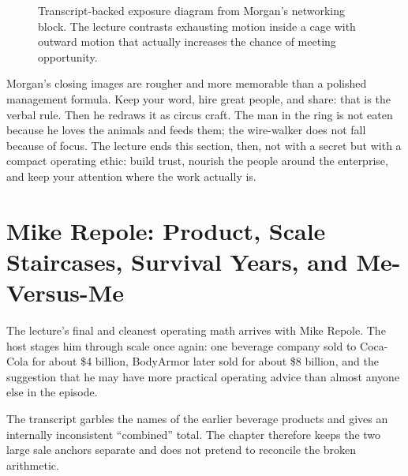 \begin{figure}[h]
\centering
{}
\caption{Transcript-backed exposure diagram from Morgan's networking block. The lecture contrasts exhausting motion inside a cage with outward motion that actually increases the chance of meeting opportunity.}
\end{figure}

Morgan's closing images are rougher and more memorable than a polished management formula. Keep your word, hire great people, and share: that is the verbal rule. Then he redraws it as circus craft. The man in the ring is not eaten because he loves the animals and feeds them; the wire-walker does not fall because of focus. The lecture ends this section, then, not with a secret but with a compact operating ethic: build trust, nourish the people around the enterprise, and keep your attention where the work actually is.

\section{Mike Repole: Product, Scale Staircases, Survival Years, and Me-Versus-Me}

The lecture's final and cleanest operating math arrives with Mike Repole. The host stages him through scale once again: one beverage company sold to Coca-Cola for about \$4 billion, BodyArmor later sold for about \$8 billion, and the suggestion that he may have more practical operating advice than almost anyone else in the episode.

\begin{remark}
The transcript garbles the names of the earlier beverage products and gives an internally inconsistent ``combined'' total. The chapter therefore keeps the two large sale anchors separate and does not pretend to reconcile the broken arithmetic.
\end{remark}

